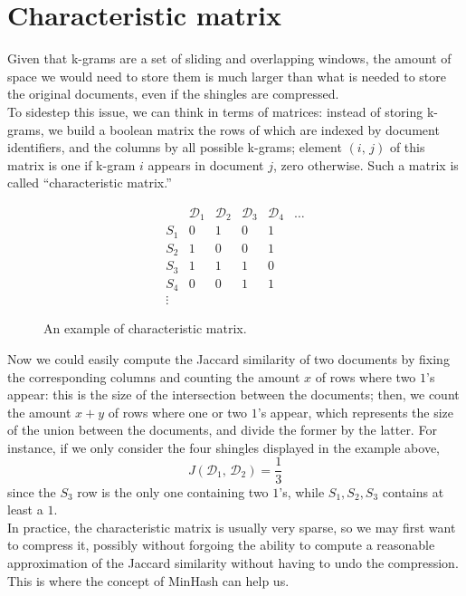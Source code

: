 \documentclass{article}
\begin{document}
  \section{Characteristic matrix}
  Given that k-grams are a set of sliding and overlapping windows, the amount
  of space we would need to store them is much larger than what is needed to
  store the original documents, even if the shingles are compressed. \\
  To sidestep this issue, we can think in terms of matrices: instead of storing
  k-grams, we build a boolean matrix the rows of which are indexed by document
  identifiers, and the columns by all possible k-grams; element
  \( ( i, \, j ) \) of this matrix is one if k-gram \( i \) appears in document
  \( j \), zero otherwise. Such a matrix is called “characteristic matrix.”
  \begin{figure}[H]
    \[
      \begin{array}{l|rrrrr}
        & \mathcal D_1 & \mathcal D_2 & \mathcal D_3 & \mathcal D_4 & \dots \\
        \hline
        S_1 &   0 &   1 &   0 &   1 & \\
        S_2 &   1 &   0 &   0 &   1 & \\
        S_3 &   1 &   1 &   1 &   0 & \\
        S_4 &   0 &   0 &   1 &   1 & \\
        \vdots &     &     &     &     &
      \end{array}
    \]
    \caption*{An example of characteristic matrix.}
  \end{figure}
  Now we could easily compute the Jaccard similarity of two documents by fixing
  the corresponding columns and counting the amount \( x \) of rows where two
  \( 1 \)'s appear: this is the size of the intersection between the documents;
  then, we count the amount \( x + y \) of rows where one or two \( 1 \)'s
  appear, which represents the size of the union between the documents, and
  divide the former by the latter. For instance, if we only consider the four
  shingles displayed in the example above,
  \[
    J ( \mathcal D_1, \, \mathcal D_2 ) = \frac{ 1 }{ 3 }
  \]
  since the \( S_3 \) row is the only one containing two \( 1 \)'s, while
  \( S_1, S_2, S_3 \) contains at least a \( 1 \). \\
  In practice, the characteristic matrix is usually very sparse, so we may
  first want to compress it, possibly without forgoing the ability to compute a
  reasonable approximation of the Jaccard similarity without having to undo the
  compression. This is where the concept of MinHash can help us.
\end{document}
